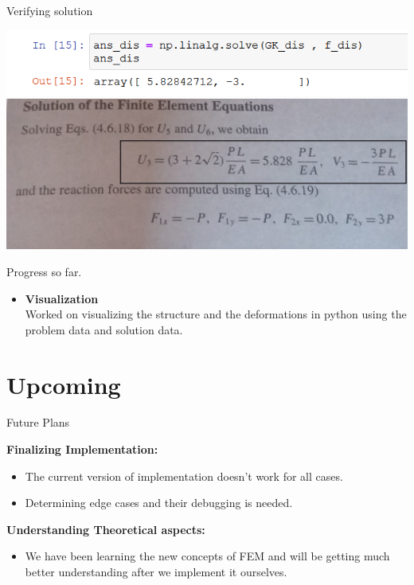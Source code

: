 \documentclass{beamer}
\begin{document}
\begin{frame}[t]{Verifying solution }
	\begin{itemize}
		\begin{center}
			\includegraphics[width=\linewidth]{ans1}
			\includegraphics[width=0.9\linewidth]{book}
		\end{center}
		

		
	\end{itemize}
\end{frame}

\begin{frame}[t]{Progress so far. }
	\begin{itemize}

		
		\item \textbf{Visualization}\\
		Worked on visualizing the structure and the deformations in python using the problem data and solution data.\\
		
		
	\end{itemize}
	
\end{frame}
\section{Upcoming}
\begin{frame}{Future Plans}
	
	\textbf{Finalizing Implementation:}
	\begin{itemize}
		\item The current version of implementation doesn't work for all cases.
		\item Determining edge cases and their debugging is needed.
		
	\end{itemize}
	\vspace{10px}
	\textbf{Understanding Theoretical aspects:}
\begin{itemize}
	\item We have been learning the new concepts of FEM and will be getting much better understanding after we implement it ourselves.
	
\end{itemize}
\end{frame}
\end{document}
